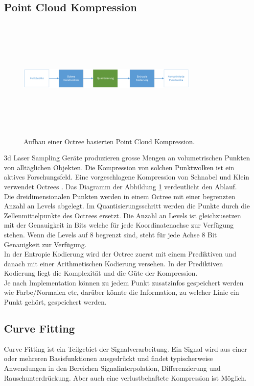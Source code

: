 \subsection{Point Cloud Kompression}
\begin{figure}[!htbp]
	\center
	\includegraphics[width=0.8\textwidth,height=6cm,keepaspectratio]{./pictures/state/pointcloud.png}
	\caption{Aufbau einer Octree basierten Point Cloud Kompression.}
	\label{state:pointcloud:abb}
\end{figure}
3d Laser Sampling Geräte produzieren grosse Mengen an volumetrischen Punkten von alltäglichen Objekten. Die Kompression von solchen Punktwolken ist ein aktives Forschungsfeld. Eine vorgeschlagene Kompression  von Schnabel und Klein \cite{schnabel2006octree} verwendet Octrees \cite{wiki:octree}. Das Diagramm der Abbildung \ref{state:pointcloud:abb} verdeutlicht den Ablauf.\\
Die dreidimensionalen Punkten werden in einem Octree mit einer begrenzten Anzahl an Levels abgelegt. Im Quantisierungsschritt werden die Punkte durch die Zellenmittelpunkte des Octrees ersetzt. Die Anzahl an Levels ist gleichzusetzen mit der Genauigkeit in Bits welche für jede Koordinatenachse zur Verfügung stehen. Wenn die Levels auf $8$ begrenzt sind, steht für jede Achse $8$ Bit Genauigkeit zur Verfügung.\\
In der Entropie Kodierung wird der Octree zuerst mit einem Prediktiven und danach mit einer Arithmetischen Kodierung versehen. In der Prediktiven Kodierung liegt die Komplexität und die Güte der Kompression.\\

Je nach Implementation können zu jedem Punkt zusatzinfos gespeichert werden wie Farbe/Normalen etc, darüber könnte die Information, zu welcher Linie ein Punkt gehört, gespeichert werden.

\subsection{Curve Fitting}
Curve Fitting ist ein Teilgebiet der Signalverarbeitung. Ein Signal wird aus einer oder mehreren Basisfunktionen ausgedrückt und findet typischerweise Anwendungen in den Bereichen Signalinterpolation, Differenzierung und Rauschunterdrückung. Aber auch eine verlustbehaftete Kompression ist Möglich.


